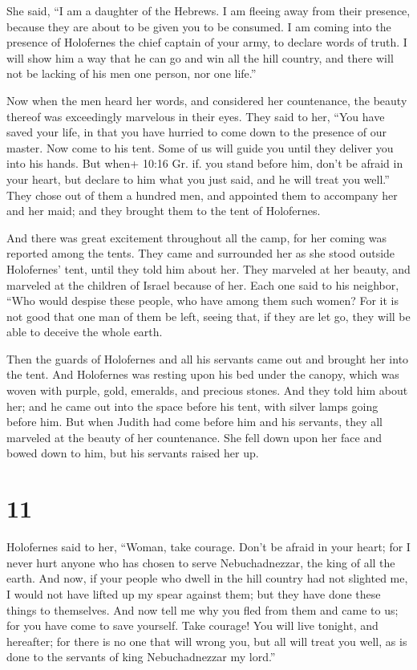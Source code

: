 She said, ``I am a daughter of the Hebrews. I am fleeing away from their
presence, because they are about to be given you to be consumed.
 I am coming into the presence of Holofernes the chief
captain of your army, to declare words of truth. I will show him a way
that he can go and win all the hill country, and there will not be
lacking of his men one person, nor one life.''

 Now when the men heard her words, and considered her
countenance, the beauty thereof was exceedingly marvelous in their eyes.
They said to her,  ``You have saved your life, in that you
have hurried to come down to the presence of our master. Now come to his
tent. Some of us will guide you until they deliver you into his hands.
 But when+ 10:16 Gr. if. you stand before him, don't be
afraid in your heart, but declare to him what you just said, and he will
treat you well.''  They chose out of them a hundred men,
and appointed them to accompany her and her maid; and they brought them
to the tent of Holofernes.

 And there was great excitement throughout all the camp,
for her coming was reported among the tents. They came and surrounded
her as she stood outside Holofernes' tent, until they told him about
her.  They marveled at her beauty, and marveled at the
children of Israel because of her. Each one said to his neighbor, ``Who
would despise these people, who have among them such women? For it is
not good that one man of them be left, seeing that, if they are let go,
they will be able to deceive the whole earth.

 Then the guards of Holofernes and all his servants came
out and brought her into the tent.  And Holofernes was
resting upon his bed under the canopy, which was woven with purple,
gold, emeralds, and precious stones.  And they told him
about her; and he came out into the space before his tent, with silver
lamps going before him.  But when Judith had come before
him and his servants, they all marveled at the beauty of her
countenance. She fell down upon her face and bowed down to him, but his
servants raised her up.

\hypertarget{section-10}{%
\section{11}\label{section-10}}

 Holofernes said to her, ``Woman, take courage. Don't be
afraid in your heart; for I never hurt anyone who has chosen to serve
Nebuchadnezzar, the king of all the earth.  And now, if your
people who dwell in the hill country had not slighted me, I would not
have lifted up my spear against them; but they have done these things to
themselves.  And now tell me why you fled from them and came
to us; for you have come to save yourself. Take courage! You will live
tonight, and hereafter;  for there is no one that will wrong
you, but all will treat you well, as is done to the servants of king
Nebuchadnezzar my lord.''


